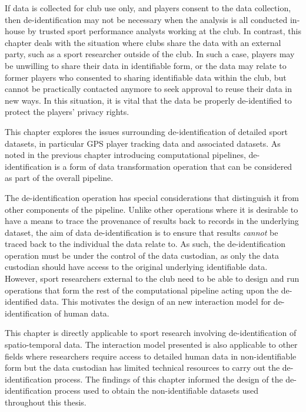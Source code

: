 If data is collected for club use only, and players consent to the data collection, then de-identification may not be necessary when the analysis is all conducted in-house by trusted sport performance analysts working at the club. In contrast, this chapter deals with the situation where clubs share the data with an external party, such as a sport researcher outside of the club. In such a case, players may be unwilling to share their data in identifiable form, or the data may relate to former players who consented to sharing identifiable data within the club, but cannot be practically contacted anymore to seek approval to reuse their data in new ways. In this situation, it is vital that the data be properly de-identified to protect the players' privacy rights.

This chapter explores the issues surrounding de-identification of detailed sport datasets, in particular GPS player tracking data and associated datasets. As noted in the previous chapter introducing computational pipelines, de-identification is a form of data transformation operation that can be considered as part of the overall pipeline. %

The de-identification operation has special considerations that distinguish it from other components of the pipeline. Unlike other operations where it is desirable to have a means to trace the provenance of results back to records in the underlying dataset, the aim of data de-identification is to ensure that results \textit{cannot} be traced back to the individual the data relate to. As such, the de-identification operation must be under the control of the data custodian, as only the data custodian should have access to the original underlying identifiable data. However, sport researchers external to the club need to be able to design and run operations that form the rest of the computational pipeline acting upon the de-identified data. This motivates the design of an new interaction model for de-identification of human data.

This chapter is directly applicable to sport research involving de-identification of spatio-temporal data. The interaction model presented is also applicable to other fields where researchers require access to detailed human data in non-identifiable form but the data custodian has limited technical resources to carry out the de-identification process. The findings of this chapter informed the design of the de-identification process used to obtain the non-identifiable datasets used throughout this thesis.

